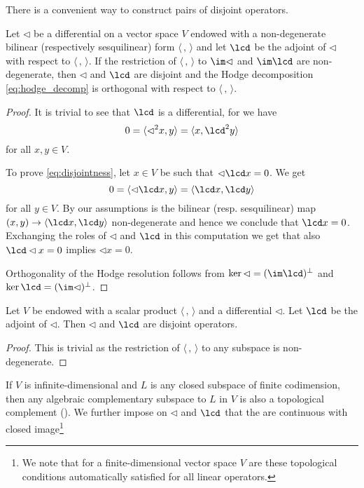 There is a convenient way to construct pairs of disjoint operators.
\begin{proposition} %
 Let $\lhd$ be a differential on a vector space $V$ endowed with a non-degenerate bilinear (respectively sesquilinear) form $\langle \, , \, \rangle$ and let $\lcd$ be the adjoint of $\lhd$ with respect to $\langle \, , \, \rangle$. If the restriction of $\langle \, , \, \rangle$ to $\im \lhd$ and $\im \lcd$ are non-degenerate, then $\lhd$ and $\lcd$ are disjoint and the Hodge decomposition \eqref{eq:hodge_decomp} is orthogonal with respect to $\langle \, , \, \rangle$.
\end{proposition}
\begin{proof}
 It is trivial to see that $\lcd$ is a differential, for we have 
 \[ 0 = \langle \lhd ^2 x, y \rangle = \langle x, \lcd^2 y \rangle\]
 for all $x,y\in V$.

 To prove \eqref{eq:disjointness}, let $x\in V$ be such that $\lhd \lcd x = 0$. We get
 \[ 0 = \langle \lhd\lcd x , y \rangle = \langle \lcd x, \lcd y \rangle \]
 for all $y\in V$. By our assumptions is the bilinear (resp. sesquilinear) map $(x,y) \to \langle \lcd x, \lcd y \rangle$ non-degenerate and hence we conclude that $\lcd x = 0$. Exchanging the roles of $\lhd$ and $\lcd$ in this computation we get that also $\lcd \lhd x =0$ implies $\lhd x=0$.

 Orthogonality of the Hodge resolution follows from $\ker \lhd = (\im\lcd)^\perp$ and $\ker \lcd = (\im \lhd)^\perp$.
\end{proof}
\begin{corollary}
 Let $V$ be endowed with a scalar product $\langle \, , \, \rangle$ and a differential $\lhd$. Let $\lcd$ be the adjoint of $\lhd$. Then $\lhd$ and $\lcd$ are disjoint operators. 
\end{corollary}
\begin{proof}
 This is trivial as the restriction of $\langle \, , \, \rangle$ to any subspace is non-degenerate.
\end{proof}

 If $V$ is infinite-dimensional and $L$ is any closed subspace of finite codimension, then any algebraic complementary subspace to $L$ in $V$ is also a topological complement (\cite{schaefer}). We further impose on $\lhd$ and $\lcd$ that the are continuous with closed image\footnote{We note that for a finite-dimensional vector space $V$ are these topological conditions automatically satisfied for all linear operators.}


